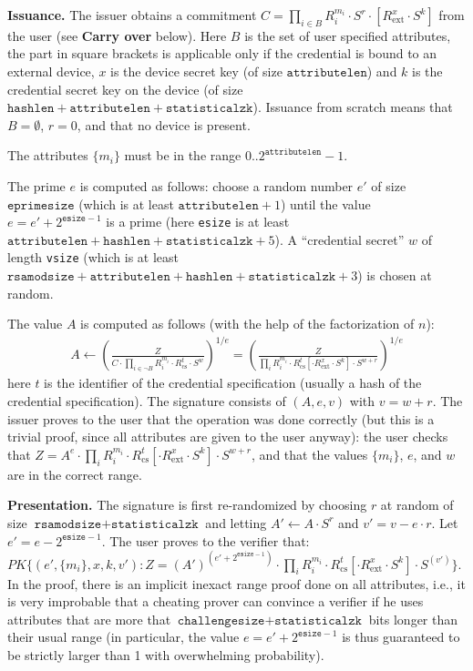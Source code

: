 \begin{description}
    \textbf{Issuance.}
    The issuer obtains a commitment $C=\prod_{i\in B}R_i^{m_i} \cdot S^r \cdot [R_\textrm{ext}^x \cdot S^k]$
    from the user (see \textbf{Carry over} below).
    Here $B$ is the set of user specified attributes, the part in square brackets is applicable
    only if the credential is bound to an external device, $x$ is the device secret key
    (of size $\texttt{attributelen}$) and $k$ is the credential secret key on the device
    (of size $\texttt{hashlen}+\texttt{attributelen}+\texttt{statisticalzk}$).
    Issuance from scratch means that $B=\emptyset$, $r=0$, and that no device is present.

    The attributes $\lbrace m_i \rbrace$ must be in the range 0..$2^{\texttt{attributelen}}-1$.

    The prime $e$ is computed as follows: choose a random number $e'$ of size
    $\texttt{eprimesize}$ (which is at least $\texttt{attributelen}+1$) until
    the value $e=e' + 2^{\texttt{esize}-1}$ is a prime (here \texttt{esize}
    is at least $\texttt{attributelen}+\texttt{hashlen}+\texttt{statisticalzk}+5$).
    A ``credential secret'' $w$ of length \texttt{vsize} (which is at least
    $\texttt{rsamodsize}+\texttt{attributelen}+\texttt{hashlen}+\texttt{statisticalzk}+3$)
    is chosen at random.

    The value $A$ is computed as follows (with the help of the factorization of $n$):
    \begin{align*}
    A \gets \left( \frac{Z}{C \cdot \prod_{i\in\neg B}{R_i^{m_i}}\cdot R_\textrm{cs}^t \cdot S^{w}} \right)^{1/e}
    =
    \left( \frac{Z}{\prod_{i}{R_i^{m_i}}\cdot R_\textrm{cs}^t [\cdot R_\textrm{ext}^x \cdot S^k] \cdot S^{w+r}} \right)^{1/e}
    \end{align*}
    here $t$ is the identifier of the credential specification (usually a hash of the credential specification).
    The signature consists of $(A, e, v)$ with $v=w+r$.
    The issuer proves to the user that the operation was done correctly (but this is a trivial proof,
    since all attributes are given to the user anyway): the user checks that
    $Z = A^e\cdot \prod_{i}{R_i^{m_i}}\cdot R_\textrm{cs}^t [\cdot R_\textrm{ext}^x \cdot S^k] \cdot S^{w+r}$,
    and that the values $\lbrace m_i\rbrace$, $e$, and $w$ are in the correct range.

    \textbf{Presentation.}
    The signature is first re-randomized by choosing $r$ at random of size $\texttt{rsamodsize}+\texttt{statisticalzk}$
    and letting $A'\gets A\cdot S^r$ and $v'=v-e\cdot r$. Let $e'=e-2^{\texttt{esize}-1}$.
    The user proves to the verifier that:
    $\mathit{PK}\lbrace (e', \lbrace m_i \rbrace, x, k, v'): Z = (A')^{(e'+ 2^{\texttt{esize}-1})}\cdot \prod_{i}{R_i^{m_i}}\cdot R_\textrm{cs}^t [\cdot R_\textrm{ext}^x \cdot S^k] \cdot S^{(v')}\rbrace$.
    In the proof, there is an implicit inexact range proof done on all attributes, i.e.,
    it is very improbable that a cheating prover can convince a verifier if he uses attributes
    that are more that $\texttt{challengesize}+\texttt{statisticalzk}$ bits longer than their
    usual range (in particular, the value $e=e' + 2^{\texttt{esize}-1}$ is thus guaranteed to be strictly larger than 1
    with overwhelming probability).


\end{description}
